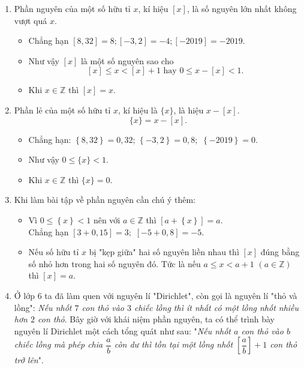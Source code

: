 \begin{enumerate}[\tickEX]
	\item Phần nguyên của một số hữu tỉ $x$, kí hiệu $[x]$, là số nguyên lớn nhất không vượt quá $x$. 
	\begin{itemize}
		\item Chẳng hạn $[8,32]=8; [-3,2]=-4; [-2019]=-2019$.
		\item Như vậy $[x]$ là một số nguyên sao cho
		$$[x]\le x < [x]+1 \,\, \text{hay} \,\, 0\le x-[x]<1.$$
		\item Khi $x\in\mathbb{Z}$ thì $[x]=x$.
	\end{itemize}
	\item Phần lẻ của một số hữu tỉ $x$, kí hiệu là $\{x\}$, là hiệu $x-[x]$.
	$$\{x\}=x-[x].$$
	\begin{itemize}
		\item Chẳng hạn: $\left\{ 8,32 \right\} = 0,32;\,\left\{  - 3,2 \right\} = 0,8;\,\,\left\{  - 2019 \right\} = 0.$
		\item Như vậy $0\le \{x\}<1$.
		\item Khi $x\in\mathbb{Z}$ thì $\{x\}=0$.
	\end{itemize}
	\item Khi làm bài tập về phần nguyên cần chú ý thêm:
	\begin{itemize}
		\item Vì $0 \le \left\{ x \right\} < 1$ nên với $a\in\mathbb{Z}$ thì $\left[ a + \left\{ x \right\} \right] = a$.\\
		Chẳng hạn $\left[ 3 + 0,15 \right] = 3;\,\,\left[  - 5 + 0,8 \right] =  - 5$.
		\item Nếu số hữu tỉ $x$ bị "kẹp giữa" hai số nguyên liền nhau thì $[x]$ đúng bằng số nhỏ hơn trong hai số nguyên đó. Tức là nếu $a \le x < a + 1\,\,(a \in \mathbb{Z})$ thì $[x]=a$. 
	\end{itemize}
	\item Ở lớp $6$ ta đã làm quen với nguyên lí "Dirichlet", còn gọi là nguyên lí "thỏ và lồng": {\em{Nếu nhốt $7$ con thỏ vào $3$ chiếc lồng thì ít nhất có một lồng nhốt nhiều hơn $2$ con thỏ}}. Bây giờ với khái niệm phần nguyên, ta có thể trình bày nguyên lí Dirichlet một cách tổng quát như sau: "{\em{Nếu nhốt $a$ con thỏ vào $b$ chiếc lồng mà phép chia $\dfrac{a}{b}$ còn dư thì tồn tại một lồng nhốt $\left[ \dfrac{a}{b} \right] + 1$ con thỏ trở lên}}".
\end{enumerate}
